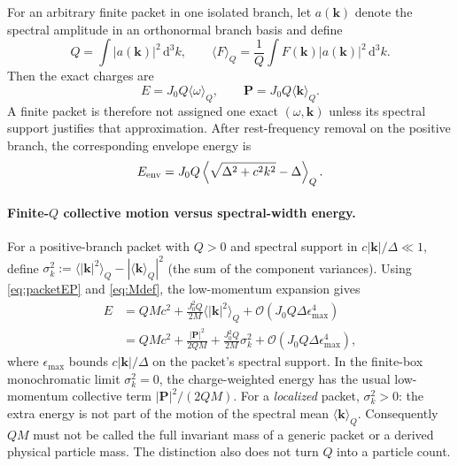 \documentclass[11pt]{article}
\theoremstyle{definition}
\newcommand{\dd}{\mathrm{d}}
\newcommand{\Order}{\mathcal{O}}
\begin{document}
For an arbitrary finite packet in one isolated branch, let $a(\mathbf k)$ denote the spectral
amplitude in an orthonormal branch basis and define
\begin{equation}
 Q=\int |a(\mathbf k)|^2\,\dd^3k,
 \qquad
 \langle F\rangle_Q=\frac{1}{Q}\int F(\mathbf k)|a(\mathbf k)|^2\,\dd^3k.
\end{equation}
Then the exact charges are
\begin{equation}
 \boxed{
 E=J_0Q\langle\omega\rangle_Q,
 \qquad
 \mathbf P=J_0Q\langle\mathbf k\rangle_Q.}
 \label{eq:packetEP}
\end{equation}
A finite packet is therefore not assigned one exact $(\omega,\mathbf k)$ unless its spectral
support justifies that approximation.  After rest-frequency removal on the positive branch,
the corresponding envelope energy is
\begin{equation}
 E_{\rm env}=J_0Q\left\langle\sqrt{\Delta^2+c^2k^2}-\Delta\right\rangle_Q.
\end{equation}

\paragraph{Finite-$Q$ collective motion versus spectral-width energy.}
For a positive-branch packet with $Q>0$ and spectral support in
$c|\mathbf k|/\Delta\ll1$, define
$\sigma_k^2:=\langle|\mathbf k|^2\rangle_Q-|\langle\mathbf k\rangle_Q|^2$
(the sum of the component variances).  Using \eqref{eq:packetEP} and
\eqref{eq:Mdef}, the low-momentum expansion gives
\begin{equation}
\begin{split}
 E&=QMc^2+\frac{J_0^2Q}{2M}\langle|\mathbf k|^2\rangle_Q
      +\Order(J_0Q\Delta\epsilon_{\max}^4)\\
  &=QMc^2+\frac{|\mathbf P|^2}{2QM}
    +\frac{J_0^2Q}{2M}\sigma_k^2
    +\Order(J_0Q\Delta\epsilon_{\max}^4),
\end{split}
\label{eq:packetmassdecomp}
\end{equation}
where $\epsilon_{\max}$ bounds $c|\mathbf k|/\Delta$ on the packet's
spectral support.  In the finite-box monochromatic limit $\sigma_k^2=0$,
the charge-weighted energy has the usual low-momentum collective term
$|\mathbf P|^2/(2QM)$.  For a \emph{localized} packet,
$\sigma_k^2>0$: the extra energy is not part of the motion of the spectral
mean $\langle\mathbf k\rangle_Q$.  Consequently $QM$ must not be called
the full invariant mass of a generic packet or a derived physical particle
mass.  The distinction also does not turn $Q$ into a particle count.
\end{document}
